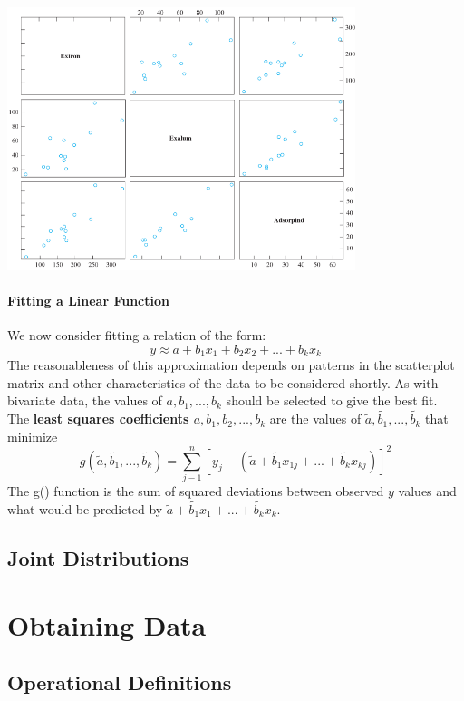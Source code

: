 \documentclass{article}
\newcommand{\p}[1]{\paragraph{#1}} %
\begin{document}
	\begin{center}
		\includegraphics[width=4in]{ex_315_scatterplot_matrix.jpg}
	\end{center}
	
	\p{Fitting a Linear Function}
		We now consider fitting a relation of the form: 
		\[ y \approx a + b_1x_1 + b_2x_2 +...+ b_kx_k \]
		The reasonableness of this approximation depends on patterns in the scatterplot matrix 
		and other characteristics of the data to be considered shortly. As with bivariate data, the 
		values of $a, b_1,...,b_k$ should be selected to give the best fit. \\
		The \textbf{least squares coefficients $a,b_1,b_2,...,b_k$} are the values of $\tilde{a},
		\tilde{b_1},...,\tilde{b_k}$ that minimize
		\[ g(\tilde{a},\tilde{b_1},...,\tilde{b_k}) = \sum_{j-1}^n [y_j - (\tilde{a} + \tilde{b_1}x_{1j}+...+
		\tilde{b_k}x_{kj})]^2 \]
		The g() function is the sum of squared deviations between observed $y$ values and what 
		would be predicted by $\tilde{a} + \tilde{b_1}x_1 +...+ \tilde{b_k}x_k$.
		
	\subsection{Joint Distributions} %

\clearpage	 %
\section{Obtaining Data} %

	\subsection{Operational Definitions} %
	
\end{document}
